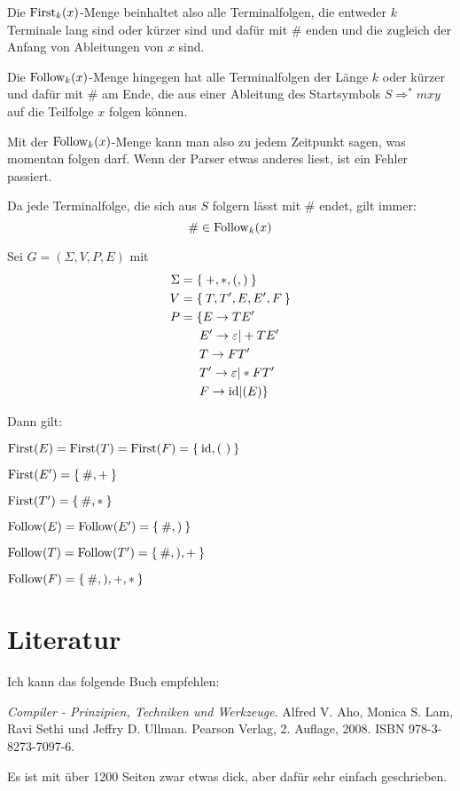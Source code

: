 Die $\operatorname{First}_k(x)$-Menge beinhaltet also alle Terminalfolgen, die entweder $k$
Terminale lang sind oder kürzer sind und dafür mit \# enden und die zugleich
der Anfang von Ableitungen von $x$ sind.

Die $\operatorname{Follow}_k(x)$-Menge hingegen hat alle Terminalfolgen der Länge $k$ oder kürzer
und dafür mit \# am Ende, die aus einer Ableitung des Startsymbols $S \Rightarrow^* mxy$
auf die Teilfolge $x$ folgen können.

Mit der $\operatorname{Follow}_k(x)$-Menge kann man also zu jedem Zeitpunkt sagen, was momentan
folgen darf. Wenn der Parser etwas anderes liest, ist ein Fehler passiert.

Da jede Terminalfolge, die sich aus $S$ folgern lässt mit \# endet, gilt immer:
\[\# \in \operatorname{Follow}_k(x)\]

\begin{beispiel}
    Sei $G = (\Sigma, V, P, E)$ mit
    \begin{align*}
        \Sigma &= \Set{+, *, (, )}\\
        V      &= \Set{T, T', E, E', F}\\
        P      &= \{ E  \rightarrow  T E'\\
               &\hphantom{= \{ } E' \rightarrow \varepsilon | +TE'\\
               &\hphantom{= \{ } T  \rightarrow FT'\\
               &\hphantom{= \{ } T' \rightarrow \varepsilon | *FT'\\
               &\hphantom{= \{ } F  \rightarrow \id | (E)\}
    \end{align*}

    Dann gilt:
    \begin{bspenum}
        \item $\operatorname{First}(E) = \operatorname{First}(T) = \operatorname{First}(F) = \Set{\textnormal{id}, (\ )}$
        \item $\operatorname{First}(E') = \Set{\#, +}$
        \item $\operatorname{First}(T') = \Set{\#, *}$
        \item $\operatorname{Follow}(E) = \operatorname{Follow}(E') = \Set{\#, )}$
        \item $\operatorname{Follow}(T) = \operatorname{Follow}(T') = \Set{\#, ), +}$
        \item $\operatorname{Follow}(F) = \Set{\#, ), +, *}$
    \end{bspenum}
\end{beispiel}

\section{Literatur}
Ich kann das folgende Buch empfehlen:

\textit{Compiler - Prinzipien, Techniken und Werkzeuge}. Alfred V. Aho, Monica S. Lam,
Ravi Sethi und Jeffry D. Ullman. Pearson Verlag, 2. Auflage, 2008. ISBN 978-3-8273-7097-6.

Es ist mit über 1200 Seiten zwar etwas dick, aber dafür sehr einfach geschrieben.


